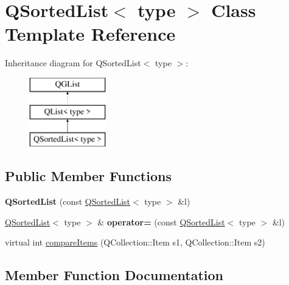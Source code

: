\hypertarget{class_q_sorted_list}{}\section{Q\+Sorted\+List$<$ type $>$ Class Template Reference}
\label{class_q_sorted_list}
Inheritance diagram for Q\+Sorted\+List$<$ type $>$\+:\begin{figure}[H]
\begin{center}
\leavevmode
\includegraphics[height=3.000000cm]{class_q_sorted_list}
\end{center}
\end{figure}
\subsection*{Public Member Functions}
\begin{DoxyCompactItemize}
\item 
\mbox{\label{class_q_sorted_list_a184a796c61d279eca17304ca6215979f}} 
{\bfseries Q\+Sorted\+List} (const \mbox{\hyperlink{class_q_sorted_list}{Q\+Sorted\+List}}$<$ type $>$ \&l)
\item 
\mbox{\label{class_q_sorted_list_a723521f9216d3cfe078f3cb0062443a1}} 
\mbox{\hyperlink{class_q_sorted_list}{Q\+Sorted\+List}}$<$ type $>$ \& {\bfseries operator=} (const \mbox{\hyperlink{class_q_sorted_list}{Q\+Sorted\+List}}$<$ type $>$ \&l)
\item 
virtual int \mbox{\hyperlink{class_q_sorted_list_ac668d73e64708886064106eebecf33ae}{compare\+Items}} (Q\+Collection\+::\+Item s1, Q\+Collection\+::\+Item s2)
\end{DoxyCompactItemize}


\subsection{Member Function Documentation}
\mbox{\label{class_q_sorted_list_ac668d73e64708886064106eebecf33ae}} 
